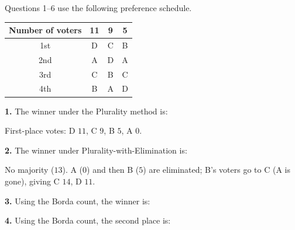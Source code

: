 \documentclass[12pt]{ximera}
\begin{document}
\begin{problem}
Questions 1--6 use the following preference schedule.
\begin{center}
\begin{tabular}{c|ccc}
Number of voters & 11 & 9 & 5\\\hline
1st & D & C & B\\
2nd & A & D & A\\
3rd & C & B & C\\
4th & B & A & D
\end{tabular}
\end{center}

\begin{prompt}
\textbf{1.} The winner under the Plurality method is:
\begin{multipleChoice}
\end{multipleChoice}
\begin{feedback}
First-place votes: D $11$, C $9$, B $5$, A $0$.
\end{feedback}
\end{prompt}

\begin{prompt}
\textbf{2.} The winner under Plurality-with-Elimination is:
\begin{multipleChoice}
\end{multipleChoice}
\begin{feedback}
No majority ($13$). A ($0$) and then B ($5$) are eliminated; B's voters go to C (A is gone), giving C $14$, D $11$.
\end{feedback}
\end{prompt}

\begin{prompt}
\textbf{3.} Using the Borda count, the winner is:
\begin{multipleChoice}
\end{multipleChoice}
\end{prompt}

\begin{prompt}
\textbf{4.} Using the Borda count, the second place is:
\begin{multipleChoice}
\end{multipleChoice}
\end{prompt}


\end{problem}
\end{document}

